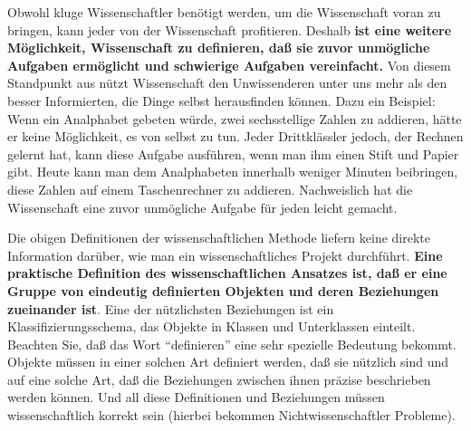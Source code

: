 Obwohl kluge Wissenschaftler benötigt werden, um die Wissenschaft voran zu bringen, kann jeder von der Wissenschaft profitieren.
Deshalb \textbf{ist eine weitere Möglichkeit, Wissenschaft zu definieren, daß sie zuvor unmögliche Aufgaben ermöglicht und schwierige Aufgaben vereinfacht.}
Von diesem Standpunkt aus nützt Wissenschaft den Unwissenderen unter uns mehr als den besser Informierten, die Dinge selbst herausfinden können.
Dazu ein Beispiel: Wenn ein Analphabet gebeten würde, zwei sechsstellige Zahlen zu addieren, hätte er keine Möglichkeit, es von selbst zu tun.
Jeder Drittklässler jedoch, der Rechnen gelernt hat, kann diese Aufgabe ausführen, wenn man ihm einen Stift und Papier gibt.
Heute kann man dem Analphabeten innerhalb weniger Minuten beibringen, diese Zahlen auf einem Taschenrechner zu addieren.
Nachweislich hat die Wissenschaft eine zuvor unmögliche Aufgabe für jeden leicht gemacht.

Die obigen Definitionen der wissenschaftlichen Methode liefern keine direkte Information darüber, wie man ein wissenschaftliches Projekt durchführt.
\textbf{Eine praktische Definition des wissenschaftlichen Ansatzes ist, daß er eine Gruppe von eindeutig definierten Objekten und deren Beziehungen zueinander ist}.
Eine der nützlichsten Beziehungen ist ein Klassifizierungsschema, das Objekte in Klassen und Unterklassen einteilt.
Beachten Sie, daß das Wort \enquote{definieren} eine sehr spezielle Bedeutung bekommt.
Objekte müssen in einer solchen Art definiert werden, daß sie nützlich sind und auf eine solche Art, daß die Beziehungen zwischen ihnen präzise beschrieben werden können.
Und all diese Definitionen und Beziehungen müssen wissenschaftlich korrekt sein (hierbei bekommen Nichtwissenschaftler Probleme).


